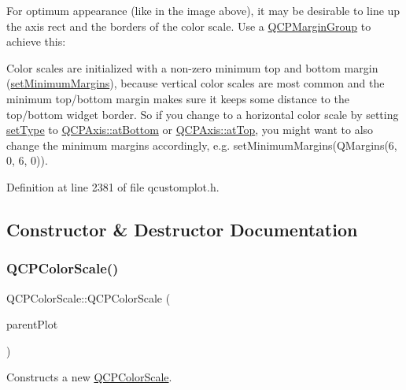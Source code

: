 For optimum appearance (like in the image above), it may be desirable to line up the axis rect and the borders of the color scale. Use a \hyperlink{class_q_c_p_margin_group}{Q\+C\+P\+Margin\+Group} to achieve this\+: 
\begin{DoxyCodeInclude}
\end{DoxyCodeInclude}
 Color scales are initialized with a non-\/zero minimum top and bottom margin (\hyperlink{class_q_c_p_layout_element_a0a8a17abc16b7923159fcc7608f94673}{set\+Minimum\+Margins}), because vertical color scales are most common and the minimum top/bottom margin makes sure it keeps some distance to the top/bottom widget border. So if you change to a horizontal color scale by setting \hyperlink{class_q_c_p_color_scale_a1bf9bdb291927c422dd66b404b206f1f}{set\+Type} to \hyperlink{class_q_c_p_axis_ae2bcc1728b382f10f064612b368bc18aa220d68888516b6c3b493d144f1ba438f}{Q\+C\+P\+Axis\+::at\+Bottom} or \hyperlink{class_q_c_p_axis_ae2bcc1728b382f10f064612b368bc18aac0ece2b680d3f545e701f75af1655977}{Q\+C\+P\+Axis\+::at\+Top}, you might want to also change the minimum margins accordingly, e.\+g. {\ttfamily set\+Minimum\+Margins(\+Q\+Margins(6, 0, 6, 0))}. 

Definition at line 2381 of file qcustomplot.\+h.



\subsection{Constructor \& Destructor Documentation}
\mbox{\label{class_q_c_p_color_scale_aa8debce1be38b54287c04d4f584394b4}} 
\subsubsection{\texorpdfstring{Q\+C\+P\+Color\+Scale()}{QCPColorScale()}}
{\footnotesize\ttfamily Q\+C\+P\+Color\+Scale\+::\+Q\+C\+P\+Color\+Scale (\begin{DoxyParamCaption}\item[{\hyperlink{class_q_custom_plot}{Q\+Custom\+Plot} $\ast$}]{parent\+Plot }\end{DoxyParamCaption})\hspace{0.3cm}{\ttfamily [explicit]}}

Constructs a new \hyperlink{class_q_c_p_color_scale}{Q\+C\+P\+Color\+Scale}. 


